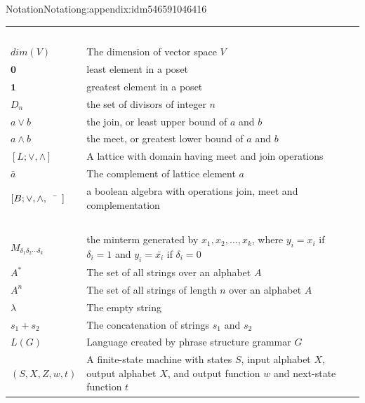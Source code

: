 \documentclass[oneside,10pt,]{book}
\numberwithin{equation}{section}
\begin{document}
\begin{appendixptx}{Notation}{}{Notation}{}{}{g:appendix:idm546591046416}
\begin{longtable}[l]{lp{}r}
\(\)&&\pageref{g:notation:idm546594925200}\\
\(dim(V)\)&The dimension of vector space \(V\)&\pageref{g:notation:idm546594827520}\\
\(\pmb{0}\)&least element in a poset&\pageref{g:notation:idm546613640176}\\
\(\pmb{1}\)&greatest element in a poset&\pageref{g:notation:idm546613639488}\\
\(D_n\)&the set of divisors of integer \(n\)&\pageref{g:notation:idm546613620976}\\
\(a \lor b\)&the join, or least upper bound of \(a\) and \(b\)&\pageref{g:notation:idm546613560752}\\
\(a \land b\)&the meet, or greatest lower bound of \(a\) and \(b\)&\pageref{g:notation:idm546613559856}\\
\([L;\lor,\land]\)&A lattice with domain having meet and join operations&\pageref{g:notation:idm546613740016}\\
\(\bar{a}\)&The complement of lattice element \(a\)&\pageref{g:notation:idm546613821872}\\
\([B;  \lor , \land, \bar{\hspace{5 mm}}]\)&a boolean algebra with operations join, meet and complementation&\pageref{g:notation:idm546613811152}\\
\(\)&&\pageref{g:notation:idm546613922880}\\
\(M_{\delta_1 \delta_2 \cdots \delta_k}\)&the minterm generated by \(x_1, x_2, \ldots , x_k\), where  \(y_i=x_i\) if \(\delta_i = 1\) and \(y_i=\bar{x_i}\) if \(\delta_i = 0\)&\pageref{g:notation:idm546613401968}\\
\(A^*\)&The set of all strings over an alphabet \(A\)&\pageref{g:notation:idm546613070896}\\
\(A^n\)&The set of all strings of length \(n\) over an alphabet \(A\)&\pageref{g:notation:idm546613070320}\\
\(\lambda\)&The empty string&\pageref{g:notation:idm546613067728}\\
\(s_1+s_2\)&The concatenation of strings \(s_1\) and \(s_2\)&\pageref{g:notation:idm546613034240}\\
\(L(G)\)&Language created by phrase structure grammar \(G\)&\pageref{g:notation:idm546612963344}\\
\((S, X, Z, w, t)\)&A finite-state machine with states \(S\), input alphabet \(X\), output alphabet \(X\), and output function \(w\) and next-state function \(t\)&\pageref{g:notation:idm546593955184}\\

\end{longtable}
\end{appendixptx}
\end{document}
